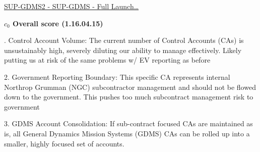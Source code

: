 % 


\begin{frame}{\href{run:../local/source-docs/1.16.04.15.pdf}{SUP-GDMS2 - SUP-GDMS - Full Launch\ldots{}}}
\centering
{}
\par
\vspace{0.75em}
\textbf{\small{\(c_0\) Overall score {\tiny (1.16.04.15)}}}\\\par
\vspace{0.5em}
\begin{minipage}{0.85\textwidth}
\raggedright
\fontsize{7}{9}. Control Account Volume: The current number of Control Accounts (CAs) is unsustainably high, severely diluting our ability to manage effectively. Likely putting us at risk of the same problems w/ EV reporting as before\par\vspace{0.5em}2. Government Reporting Boundary: This specific CA represents internal Northrop Grumman (NGC) subcontractor management and should not be flowed down to the government. This pushes too much subcontract management risk to government\par\vspace{0.5em}3. GDMS Account Consolidation: If sub-contract focused CAs are maintained as is, all General Dynamics Mission Systems (GDMS) CAs can be rolled up into a smaller, highly focused set of accounts.\par
\end{minipage}
\end{frame}
%
